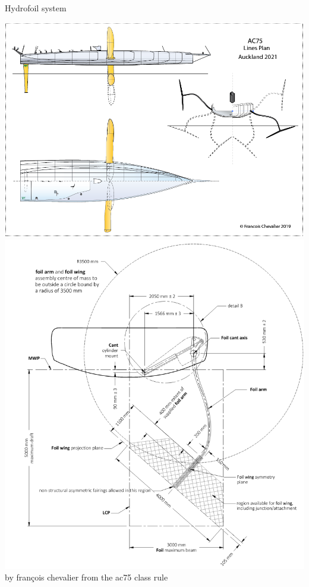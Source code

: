 \documentclass[presentation,aspectratio=169]{beamer}
\begin{document}
\begin{frame}[label={sec:orgd745c6a}]{Hydrofoil system}
 \begin{center}
\includegraphics[height=0.6\textheight]{../../figures/ac75-lines.png}
\includegraphics[height=0.7\textheight]{../../figures/ac75-class-foil.png}\\
{\footnotesize  by françois chevalier \hfill from the ac75 class rule}
\end{center}
\end{frame}
\end{document}
